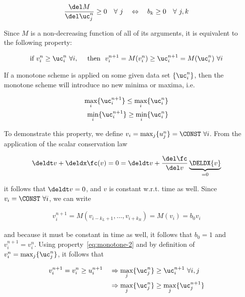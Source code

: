 \begin{align}
    \frac{\del M}{\del \uc_j^n} \geq 0 \quad \forall \ j
    \quad \Leftrightarrow \quad
    b_k \geq 0 \quad \forall \ j, k
\end{align}

Since $M$ is a non-decreasing function of all of its arguments, it is equivalent to the following
property:

\begin{align}
    \text{if } v_i^n \geq \uc_i^n \ \forall i, \quad \text{ then } \
    v_i^{n+1} = M(v_i^n) \geq \uc_i^{n+1} = M(\uc_i^n) \ \forall i \label{eq:monotone-2}
\end{align}


If a monotone scheme is applied on some given data set $\{\uc_i^n\}$, then the monotone scheme will
introduce no new minima or maxima, i.e.

\begin{align}
    \max_i \{ \uc_i^{n+1} \} \leq \max_i \{ \uc_i^n \} \label{eq:monotone-max} \\
    \min_i \{ \uc_i^{n+1} \} \geq \min_i \{ \uc_i^n \} \label{eq:monotone-min}
\end{align}

To demonstrate this property, we define $v_i = \max_j \{ u_j^n \} = \CONST \ \forall i$. From the
application of the scalar conservation law

\begin{align}
    \deldt v + \deldx \fc(v) = 0 = \deldt v + \frac{\del \fc}{\del v} \underbrace{\DELDX{v}}_{= 0}
\end{align}

it follows  that $\deldt v = 0$, and $v$ is constant w.r.t. time  as well. Since $v_i = \CONST
\ \forall i$, we can write

\begin{align}
    v_i^{n+1} = M(v_{i - k_L + 1}, \hdots, v_{i+k_R}) = M(v_i) = b_0 v_i
\end{align}

and because it must be constant in time as well, it follows that $b_0 = 1$ and $v_i^{n+1} = v_i^n$.
Using property~\ref{eq:monotone-2} and by definition of $v_i^n = \max_j \{ \uc_j^n \} $,
it follows that

\begin{align}
    v_i^{n+1} =
        v_i^n \geq u_i^{n+1} \quad
        &\Rightarrow \max_j \{ \uc_j^n \} \geq \uc_i^{n+1} \ \forall i,j \\
        &\Rightarrow \max_j \{ \uc_j^n \} \geq \max_j \{ \uc_j^{n+1} \}
\end{align}

